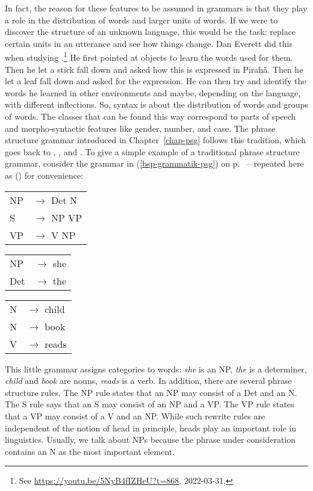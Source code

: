 In fact, the reason for these features to be assumed in grammars is that they play a role
in the distribution of words and larger units of words. If we were to discover the structure of an
unknown language, this would be the task: replace certain units in an utterance and see how things
change. Dan Everett did this when studying .\footnote{
See \url{https://youtu.be/5NyB4fIZHeU?t=868}, 2022-03-31.
} He first pointed at objects to learn the words used for them. Then he let a stick fall down and asked how this is
expressed in Pirahã. Then he let a leaf fall down and asked for the expression. He can then try and
identify the words he learned in other environments and maybe, depending on the language, with different inflections. So, syntax
is about the distribution of words and groups of words. The classes that can be found this way
correspond to parts of speech and morpho-syntactic features like gender, number, and case. The
phrase structure grammar introduced in Chapter~\ref{chap-psg} follows this tradition, which goes back to
\citet{Bloomfield26a}, \citet{Harris46a-u}, and \citet{Wells47a}. To give a simple example of a
traditional phrase structure grammar, consider the grammar in (\ref{bsp-grammatik-psg}) on
p.~\pageref{bsp-grammatik-psg} -- repeated here as () for convenience:
\ea
\label{bsp-grammatik-psg-two}
\begin{tabular}[t]{@{}l@{ }l}
{NP} & {$\to$ Det N}\\          
{S}  & {$\to$ NP VP}\\
{VP} & {$\to$ V NP}
\end{tabular}\hspace{2cm}%
\begin{tabular}[t]{@{}l@{ }l}
{NP}  & {$\to$ she}\\
{Det} & {$\to$ the}\\
\end{tabular}\hspace{8mm}
\begin{tabular}[t]{@{}l@{ }l}
{N} & {$\to$ child}\\
{N} & {$\to$ book}\\
{V} & {$\to$ reads}\\
\end{tabular}
\z
This little grammar assigns categories to words: \emph{she} is an NP, \emph{the} is a determiner,
\emph{child} and \emph{book} are nouns, \emph{reads} is  a verb. In addition, there are several
phrase structure rules. The NP rule states that an NP may consist of a Det and an N. The S rule says
that an S may consist of an NP and a VP. The VP rule states that a VP may consist of a V and an
NP. While such rewrite rules are independent of the notion of head in principle, heads play an
important role in linguistics. Usually, we talk about NPs because the phrase under consideration
contains an N as the most important element.

